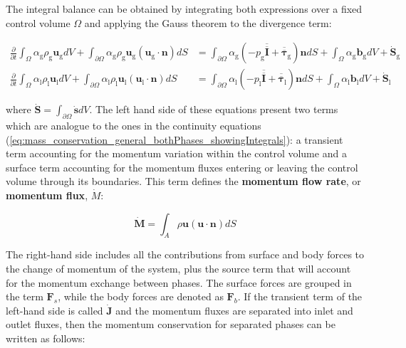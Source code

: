 The integral balance can be obtained by integrating both expressions over a fixed control volume $\Omega$ and applying the Gauss theorem to the divergence term:

\begin{subequations}
\begin{align}
\frac{\partial}{\partial t} \int_{\Omega} \alpha_\mathrm{g} \rho_\mathrm{g} \boldsymbol{u}_\mathrm{g} dV  + \int_{\partial {\Omega}} \alpha_\mathrm{g} \rho_\mathrm{g} \boldsymbol{u}_\mathrm{g} \left( \boldsymbol{u}_\mathrm{g} \cdot \boldsymbol{n} \right) dS &=  \int_{\partial {\Omega}} \alpha_\mathrm{g} \left( - p_\mathrm{g} \overline{\overline{\pmb{I}}} + \overline{\overline{\pmb{\tau}}}_\mathrm{g} \right) \boldsymbol{n} dS + \int_{\Omega} \alpha_\mathrm{g} \boldsymbol{b}_\mathrm{g} dV + \dot{\boldsymbol{S}}_\mathrm{g} \\
\frac{\partial}{\partial t} \int_{\Omega} \alpha_\mathrm{l} \rho_\mathrm{l} \boldsymbol{u}_\mathrm{l} dV  + \int_{\partial {\Omega}} \alpha_\mathrm{l} \rho_\mathrm{l} \boldsymbol{u}_\mathrm{l} \left( \boldsymbol{u}_\mathrm{l} \cdot \boldsymbol{n} \right) dS &=  \int_{\partial {\Omega}} \alpha_\mathrm{l} \left( - p_\mathrm{l} \overline{\overline{\pmb{I}}} + \overline{\overline{\pmb{\tau}}}_\mathrm{l} \right) \boldsymbol{n} dS + \int_{\Omega} \alpha_\mathrm{l}  \boldsymbol{b}_\mathrm{l} dV + \dot{\boldsymbol{S}}_\mathrm{l}
\end{align}
\end{subequations}

where $\dot{\boldsymbol{S}} = \int_{\partial {\Omega}} \dot{\boldsymbol{s}} dV$. The left hand side of these equations present two terms which are analogue to the ones in the continuity equations (\ref{eq:mass_conservation_general_bothPhases_showingIntegrals}): a transient term accounting for the momentum variation within the control volume and a surface term accounting for the momentum fluxes entering or leaving the control volume through its boundaries. This term defines the \textbf{momentum flow rate}, or \textbf{momentum flux}, $\dot{M}$:

\begin{equation}
\label{eq:momentum_flow_rate_definition_general}
\boxed{
\dot{ \boldsymbol{M} } = \int_A \rho \boldsymbol{u} \left( \boldsymbol{u} \cdot \boldsymbol{n} \right) dS
}
\end{equation}

The right-hand side includes all the contributions from surface and body forces to the change of momentum of the system, plus the source term that will account for the momentum exchange between phases. The surface forces are grouped in the term $\boldsymbol{F}_s$, while the body forces are denoted as $\boldsymbol{F}_b$. If the transient term of the left-hand side is called $\dot{\boldsymbol{J}}$ and the momentum fluxes are separated into inlet and outlet fluxes, then the momentum conservation for separated phases can be written as follows:

